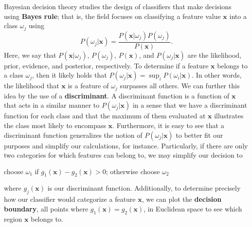\documentclass[ 12pt ]{article}
\begin{document}
Bayesian decision theory studies the design of classifiers that make decisions using \textbf{Bayes rule}; that is, the field focuses on classifying a feature value $\textbf{x}$ into
a class $\omega_j$ using $$P(\omega_j|\textbf{x}) = \frac{P(\textbf{x}|\omega_j) P(\omega_j)}{P(\textbf{x})}.$$ Here, we say that $P(\textbf{x}|
\omega_j)$, $P(\omega_j)$, $P(\textbf{x})$, and $P(\omega_j|\textbf{x})$ are the likelihood, prior, evidence, and posterior, respectively. To determine if a feature $\textbf{x}$
belongs to a class $\omega_j$, then it likely holds that $P(\omega_j|\textbf{x}) = \sup_i P(\omega_i|\textbf{x})$. In other words, the likelihood that $\textbf{x}$ is a feature of
$\omega_j$ surpasses all others. We can further this idea by the use of a \textbf{discriminant}. A discriminant function is a function of $\textbf{x}$ that acts in a similar manner
to $P(\omega_j|\textbf{x})$ in a sense that we have a discriminant function for each class and that the maximum of them evaluated at $\textbf{x}$ illustrates the class most likely
to encompass $\textbf{x}$. Furthermore, it is easy to see that a discriminant function generalizes the notion of $P(\omega_j|\textbf{x})$ to better fit our purposes and simplify our
calculations, for instance. Particularly, if there are only two categories for which features can belong to, we may simplify our decision to
\begin{displayquote}
    choose $\omega_1$ if $g_1(\textbf{x}) - g_2(\textbf{x}) > 0$; otherwise choose $\omega_2$
\end{displayquote}
where $g_j(\textbf{x})$ is our discriminant function. Additionally, to determine precisely how our classifier would categorize a feature $\textbf{x}$, we can plot the \textbf{decision
boundary}, all points where $g_1(\textbf{x}) = g_2(\textbf{x})$, in Euclidean space to see which region $\textbf{x}$ belongs to.
\end{document}
